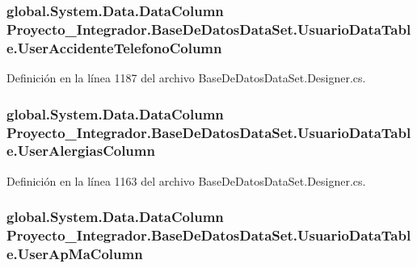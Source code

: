 \subsubsection[{User\-Accidente\-Telefono\-Column}]{\setlength{\rightskip}{0pt plus 5cm}global.\-System.\-Data.\-Data\-Column Proyecto\-\_\-\-Integrador.\-Base\-De\-Datos\-Data\-Set.\-Usuario\-Data\-Table.\-User\-Accidente\-Telefono\-Column\hspace{0.3cm}{\ttfamily [get]}}\label{class_proyecto___integrador_1_1_base_de_datos_data_set_1_1_usuario_data_table_a8b0fb823ab433ddb4a2597e8d533ff3b}


Definición en la línea 1187 del archivo Base\-De\-Datos\-Data\-Set.\-Designer.\-cs.

\subsubsection[{User\-Alergias\-Column}]{\setlength{\rightskip}{0pt plus 5cm}global.\-System.\-Data.\-Data\-Column Proyecto\-\_\-\-Integrador.\-Base\-De\-Datos\-Data\-Set.\-Usuario\-Data\-Table.\-User\-Alergias\-Column\hspace{0.3cm}{\ttfamily [get]}}\label{class_proyecto___integrador_1_1_base_de_datos_data_set_1_1_usuario_data_table_a729270748fae2a2558894a91b2857787}


Definición en la línea 1163 del archivo Base\-De\-Datos\-Data\-Set.\-Designer.\-cs.

\subsubsection[{User\-Ap\-Ma\-Column}]{\setlength{\rightskip}{0pt plus 5cm}global.\-System.\-Data.\-Data\-Column Proyecto\-\_\-\-Integrador.\-Base\-De\-Datos\-Data\-Set.\-Usuario\-Data\-Table.\-User\-Ap\-Ma\-Column\hspace{0.3cm}{\ttfamily [get]}}\label{class_proyecto___integrador_1_1_base_de_datos_data_set_1_1_usuario_data_table_a750da3a8dfb26d8c0dbc4416a5ece7d5}


